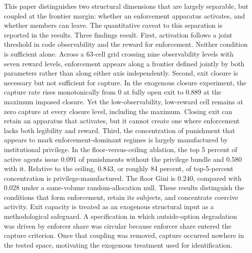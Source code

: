 \documentclass[12pt]{article}
\begin{document}
This paper distinguishes two structural dimensions that are largely separable, but coupled at the frontier margin: whether an enforcement apparatus activates, and whether members can leave. The quantitative caveat to this separation is reported in the results. Three findings result. First, activation follows a joint threshold in code observability and the reward for enforcement. Neither condition is sufficient alone. Across a 63-cell grid crossing nine observability levels with seven reward levels, enforcement appears along a frontier defined jointly by both parameters rather than along either axis independently. Second, exit closure is necessary but not sufficient for capture. In the exogenous closure experiment, the capture rate rises monotonically from 0 at fully open exit to 0.889 at the maximum imposed closure. Yet the low-observability, low-reward cell remains at zero capture at every closure level, including the maximum. Closing exit can retain an apparatus that activates, but it cannot create one where enforcement lacks both legibility and reward. Third, the concentration of punishment that appears to mark enforcement-dominant regimes is largely manufactured by institutional privilege. In the floor-versus-ceiling ablation, the top 5 percent of active agents issue 0.091 of punishments without the privilege bundle and 0.580 with it. Relative to the ceiling, 0.843, or roughly 84 percent, of top-5-percent concentration is privilege-manufactured. The floor Gini is 0.240, compared with 0.028 under a same-volume random-allocation null. These results distinguish the conditions that form enforcement, retain its subjects, and concentrate coercive activity. Exit capacity is treated as an exogenous structural input as a methodological safeguard. A specification in which outside-option degradation was driven by enforcer share was circular because enforcer share entered the capture criterion. Once that coupling was removed, capture occurred nowhere in the tested space, motivating the exogenous treatment used for identification.
\end{document}
